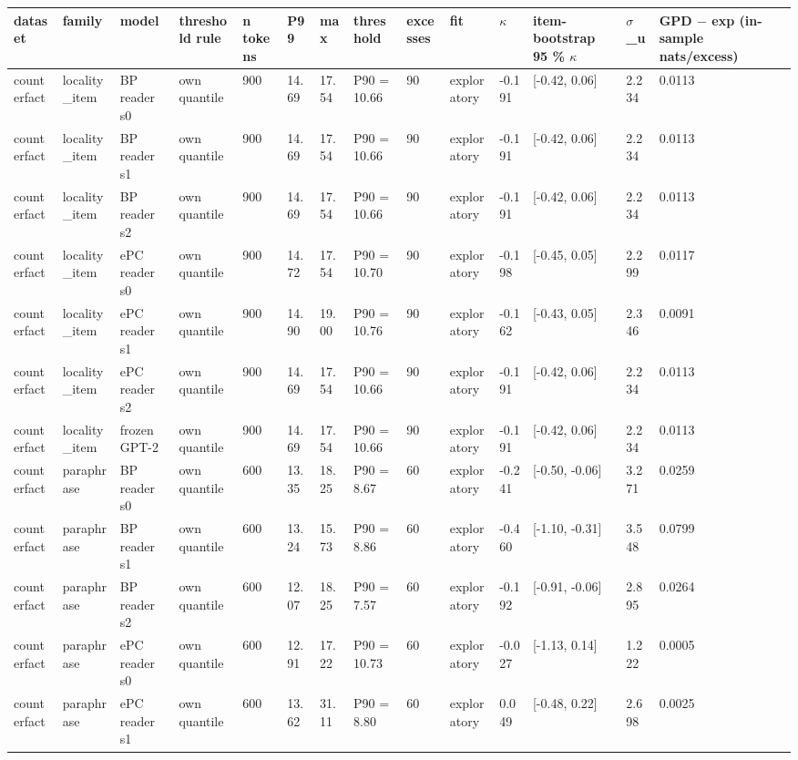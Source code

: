 \documentclass[10pt,a4paper]{article}
\begin{document}
\begin{center}\tiny
\begin{tabularx}{\textwidth}{@{}p{}XXXXXXXXXXXXX@{}}
\toprule
dataset & family & model & threshold rule & n tokens & P99 & max & threshold & excesses & fit & $\kappa$ & item-bootstrap 95 \% $\kappa$ & $\sigma$\_u & GPD $-$ exp (in-sample nats/excess) \\ \midrule
counterfact & locality\_item & BP reader s0 & own quantile & 900 & 14.69 & 17.54 & P90 = 10.66 & 90 & exploratory & -0.191 & [-0.42, 0.06] & 2.234 & 0.0113 \\
counterfact & locality\_item & BP reader s1 & own quantile & 900 & 14.69 & 17.54 & P90 = 10.66 & 90 & exploratory & -0.191 & [-0.42, 0.06] & 2.234 & 0.0113 \\
counterfact & locality\_item & BP reader s2 & own quantile & 900 & 14.69 & 17.54 & P90 = 10.66 & 90 & exploratory & -0.191 & [-0.42, 0.06] & 2.234 & 0.0113 \\
counterfact & locality\_item & ePC reader s0 & own quantile & 900 & 14.72 & 17.54 & P90 = 10.70 & 90 & exploratory & -0.198 & [-0.45, 0.05] & 2.299 & 0.0117 \\
counterfact & locality\_item & ePC reader s1 & own quantile & 900 & 14.90 & 19.00 & P90 = 10.76 & 90 & exploratory & -0.162 & [-0.43, 0.05] & 2.346 & 0.0091 \\
counterfact & locality\_item & ePC reader s2 & own quantile & 900 & 14.69 & 17.54 & P90 = 10.66 & 90 & exploratory & -0.191 & [-0.42, 0.06] & 2.234 & 0.0113 \\
counterfact & locality\_item & frozen GPT-2 & own quantile & 900 & 14.69 & 17.54 & P90 = 10.66 & 90 & exploratory & -0.191 & [-0.42, 0.06] & 2.234 & 0.0113 \\
counterfact & paraphrase & BP reader s0 & own quantile & 600 & 13.35 & 18.25 & P90 = 8.67 & 60 & exploratory & -0.241 & [-0.50, -0.06] & 3.271 & 0.0259 \\
counterfact & paraphrase & BP reader s1 & own quantile & 600 & 13.24 & 15.73 & P90 = 8.86 & 60 & exploratory & -0.460 & [-1.10, -0.31] & 3.548 & 0.0799 \\
counterfact & paraphrase & BP reader s2 & own quantile & 600 & 12.07 & 18.25 & P90 = 7.57 & 60 & exploratory & -0.192 & [-0.91, -0.06] & 2.895 & 0.0264 \\
counterfact & paraphrase & ePC reader s0 & own quantile & 600 & 12.91 & 17.22 & P90 = 10.73 & 60 & exploratory & -0.027 & [-1.13, 0.14] & 1.222 & 0.0005 \\
counterfact & paraphrase & ePC reader s1 & own quantile & 600 & 13.62 & 31.11 & P90 = 8.80 & 60 & exploratory & 0.049 & [-0.48, 0.22] & 2.698 & 0.0025 \\

\end{tabularx}
\end{center}
\end{document}
